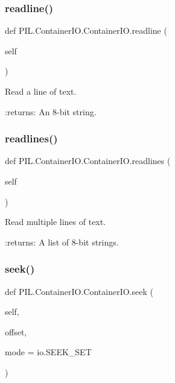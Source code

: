 \subsubsection{\texorpdfstring{readline()}{readline()}}
{\footnotesize\ttfamily def P\+I\+L.\+Container\+I\+O.\+Container\+I\+O.\+readline (\begin{DoxyParamCaption}\item[{}]{self }\end{DoxyParamCaption})}

\begin{DoxyVerb}Read a line of text.

:returns: An 8-bit string.
\end{DoxyVerb}
 \mbox{\label{classPIL_1_1ContainerIO_1_1ContainerIO_a947540fef26774382293b899fc5d6e01}} 
\subsubsection{\texorpdfstring{readlines()}{readlines()}}
{\footnotesize\ttfamily def P\+I\+L.\+Container\+I\+O.\+Container\+I\+O.\+readlines (\begin{DoxyParamCaption}\item[{}]{self }\end{DoxyParamCaption})}

\begin{DoxyVerb}Read multiple lines of text.

:returns: A list of 8-bit strings.
\end{DoxyVerb}
 \mbox{\label{classPIL_1_1ContainerIO_1_1ContainerIO_a22eaf0957574b0a177e39fdc53c82d4d}} 
\subsubsection{\texorpdfstring{seek()}{seek()}}
{\footnotesize\ttfamily def P\+I\+L.\+Container\+I\+O.\+Container\+I\+O.\+seek (\begin{DoxyParamCaption}\item[{}]{self,  }\item[{}]{offset,  }\item[{}]{mode = {\ttfamily io.SEEK\+\_\+SET} }\end{DoxyParamCaption})}

